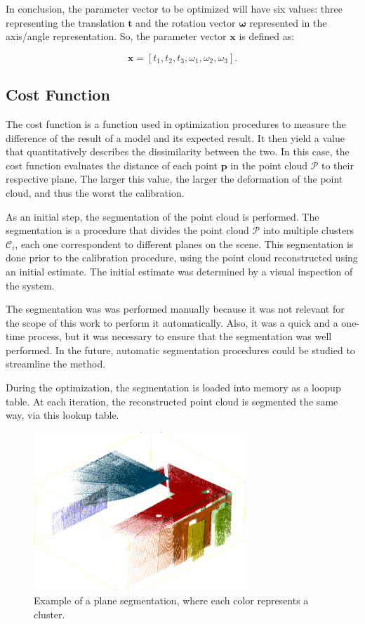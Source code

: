 \documentclass[conference]{IEEEtran}
\begin{document}
In conclusion, the parameter vector to be optimized will have six values: three representing the translation $\bm{t}$ and the rotation vector $\bm{\omega}$ represented in the axis/angle representation. So, the parameter vector $\bm{x}$ is defined as:

\begin{equation}
    \bm{x} = \left[t_1, t_2, t_3, \omega_1, \omega_2, \omega_3\right].
\end{equation}

\subsection{Cost Function}

The cost function is a function used in optimization procedures to measure the difference of the result of a model and its expected result. It then yield a value that quantitatively describes the dissimilarity between the two. In this case, the cost function evaluates the distance of each point $\mathbf{p}$ in the point cloud $\mathcal{P}$ to their respective plane. The larger this value, the larger the deformation of the point cloud, and thus the worst the calibration.

As an initial step, the segmentation of the point cloud is performed. The segmentation is a procedure that divides the point cloud $\mathcal{P}$ into multiple clusters $\mathcal{C}_i$, each one correspondent to different planes on the scene. This segmentation is done prior to the calibration procedure, using the point cloud reconstructed using an initial estimate. The initial estimate was determined by a visual inspection of the system.

The segmentation was was performed manually because it was not relevant for the scope of this work to perform it automatically. Also, it was a quick and a one-time process, but it was necessary to ensure that the segmentation was well performed. In the future, automatic segmentation procedures could be studied to streamline the method.

During the optimization, the segmentation is loaded into memory as a loopup table. At each iteration, the reconstructed point cloud is segmented the same way, via this lookup table.

\begin{figure}[h]
    \centering
    \includegraphics[width=8cm]{images/segmented-pointcloud}
    \caption{Example of a plane segmentation, where each color represents a cluster.}
    \label{figure:cluster-segmentation-1}
\end{figure}
\end{document}
